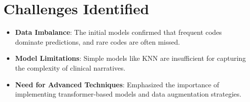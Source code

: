 \section{Challenges Identified}
\begin{itemize}
    \item \textbf{Data Imbalance}: The initial models confirmed that frequent codes dominate predictions, and rare codes are often missed.
    \item \textbf{Model Limitations}: Simple models like KNN are insufficient for capturing the complexity of clinical narratives.
    \item \textbf{Need for Advanced Techniques}: Emphasized the importance of implementing transformer-based models and data augmentation strategies.
\end{itemize}
